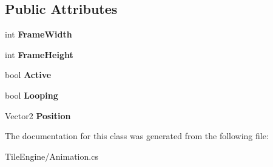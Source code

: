 \subsection*{Public Attributes}
\begin{DoxyCompactItemize}
\item 
\hypertarget{class_tile_engine_1_1_animation_a6144d8d5c904bfd318a0f1891f68d31a}{int {\bfseries Frame\-Width}}\label{db/d5e/class_tile_engine_1_1_animation_a6144d8d5c904bfd318a0f1891f68d31a}

\item 
\hypertarget{class_tile_engine_1_1_animation_ad6d0570216f225b5965bdf25ae1ff92a}{int {\bfseries Frame\-Height}}\label{db/d5e/class_tile_engine_1_1_animation_ad6d0570216f225b5965bdf25ae1ff92a}

\item 
\hypertarget{class_tile_engine_1_1_animation_a428519a2f385fb1eb29ffa3852c5a505}{bool {\bfseries Active}}\label{db/d5e/class_tile_engine_1_1_animation_a428519a2f385fb1eb29ffa3852c5a505}

\item 
\hypertarget{class_tile_engine_1_1_animation_a22b62fda1e3fdb5cc1d20203b72362cb}{bool {\bfseries Looping}}\label{db/d5e/class_tile_engine_1_1_animation_a22b62fda1e3fdb5cc1d20203b72362cb}

\item 
\hypertarget{class_tile_engine_1_1_animation_a75d52f1bc2b67d0bc012ad6569bfe006}{Vector2 {\bfseries Position}}\label{db/d5e/class_tile_engine_1_1_animation_a75d52f1bc2b67d0bc012ad6569bfe006}

\end{DoxyCompactItemize}


The documentation for this class was generated from the following file\-:\begin{DoxyCompactItemize}
\item 
Tile\-Engine/Animation.\-cs\end{DoxyCompactItemize}
